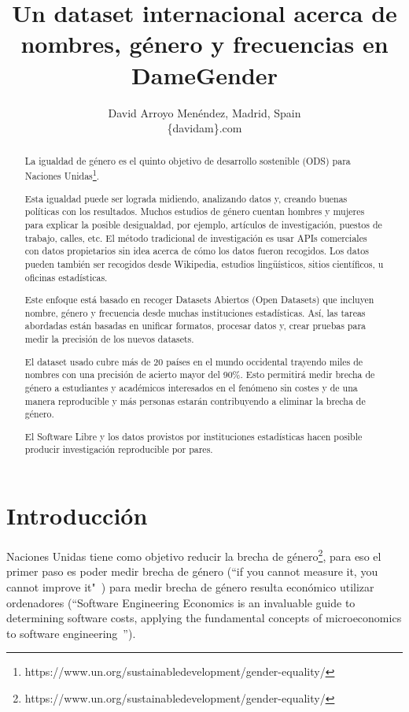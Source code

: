 \documentclass[a4paper]{article}
\title{Un dataset internacional acerca de nombres, género y frecuencias en DameGender}
\author{
David Arroyo Menéndez, Madrid, Spain \\ \{davidam\@gmail\}.com
}
\begin{document}
\maketitle

\begin{abstract}

  La igualdad de género es el quinto objetivo de desarrollo sostenible
  (ODS) para Naciones Unidas\footnote{https://www.un.org/sustainabledevelopment/gender-equality/}.

  Esta igualdad puede ser lograda midiendo, analizando datos y,
  creando buenas políticas con los resultados. Muchos estudios
  de género cuentan hombres y mujeres para explicar la posible
  desigualdad, por ejemplo, artículos de investigación, puestos
  de trabajo, calles, etc. El método tradicional de investigación
  es usar APIs comerciales con datos propietarios sin idea acerca
  de cómo los datos fueron recogidos. Los datos pueden también
  ser recogidos desde Wikipedia, estudios lingüísticos, sitios
  científicos, u oficinas estadísticas.


  Este enfoque está basado en recoger Datasets Abiertos (Open
  Datasets) que incluyen nombre, género y frecuencia desde
  muchas instituciones estadísticas. Así, las tareas abordadas
  están basadas en unificar formatos, procesar datos y, crear
  pruebas para medir la precisión de los nuevos datasets. 


  El dataset usado cubre más de 20 países en el mundo occidental
  trayendo miles de nombres con una precisión de acierto mayor del
  90\%. Esto permitirá medir brecha de género a estudiantes y
  académicos interesados en el fenómeno sin costes y de una manera
  reproducible y más personas estarán contribuyendo a eliminar la
  brecha de género.


  El Software Libre y los datos provistos por instituciones estadísticas
  hacen posible producir investigación reproducible por pares.
  
\end{abstract}

\section{Introducción}
Naciones Unidas tiene como objetivo reducir la brecha de
género\footnote{https://www.un.org/sustainabledevelopment/gender-equality/},
para eso el primer paso es poder medir brecha de género
(``if you cannot measure it, you cannot improve it"~\cite{thompson1833electrical})
para medir brecha de género resulta económico utilizar ordenadores
(``Software Engineering Economics is an invaluable guide to determining
software costs, applying the fundamental concepts of microeconomics
to software engineering~\cite{barry1981software}'').
\end{document}
